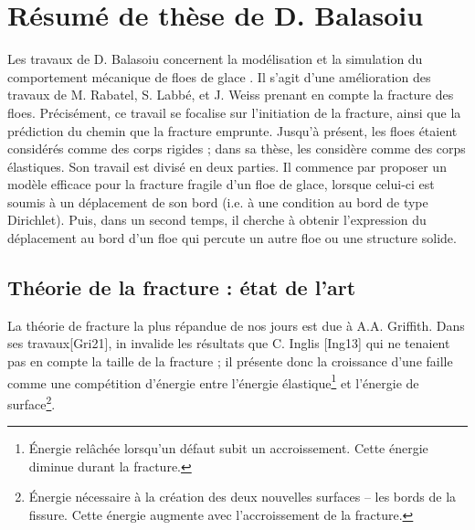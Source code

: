 
\section{Résumé de thèse de D. Balasoiu}

Les travaux de D. Balasoiu concernent la modélisation et la simulation du comportement mécanique de floes de glace \parencite{balasoiu2020thesis}. Il s'agit d'une amélioration des travaux de M. Rabatel, S. Labbé, et J. Weiss \parencite{rabatel2015thesis,rabatel2015dynamics} prenant en compte la fracture des floes. Précisément, ce travail se focalise sur l’initiation de la fracture, ainsi que la prédiction du chemin que la fracture emprunte. Jusqu’à présent, les floes étaient considérés comme des corps rigides ; dans sa thèse, \citeauthor{balasoiu2020thesis} les considère comme des corps élastiques. Son travail est divisé en deux parties. Il commence par proposer un modèle efficace pour la fracture fragile d’un floe de glace, lorsque celui-ci est soumis à un déplacement de son bord (i.e. à une condition au bord de type Dirichlet). Puis, dans un second temps, il cherche à obtenir l’expression du déplacement au bord d’un floe qui percute un autre floe ou une structure solide.

\subsection{Théorie de la fracture : état de l’art} 
 
La théorie de fracture la plus répandue de nos jours est due à A.A. Griffith. Dans ses travaux[Gri21], in invalide les résultats que C. Inglis [Ing13] qui ne tenaient pas en compte la taille de la fracture ; il présente donc la croissance d'une faille comme une compétition d'énergie entre l'énergie élastique\footnote{Énergie relâchée lorsqu’un défaut subit un accroissement. Cette énergie diminue durant la fracture.} et l'énergie de surface\footnote{Énergie nécessaire à la création des deux nouvelles surfaces – les bords de la fissure. Cette énergie augmente avec l'accroissement de la fracture.}. 

